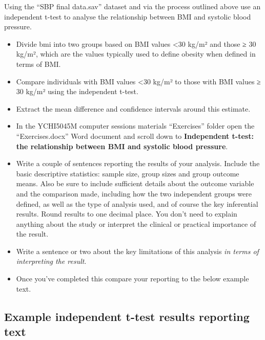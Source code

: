 \documentclass[
]{book}
\begin{document}
Using the ``SBP final data.sav'' dataset and via the process outlined above use an independent t-test to analyse the relationship between BMI and systolic blood pressure.

\begin{itemize}
\item
  Divide bmi into two groups based on BMI values \textless30 kg/m² and those ≥ 30 kg/m², which are the values typically used to define obesity when defined in terms of BMI.
\item
  Compare individuals with BMI values \textless30 kg/m² to those with BMI values ≥ 30 kg/m² using the independent t-test.
\item
  Extract the mean difference and confidence intervals around this estimate.
\item
  In the YCHI5045M computer sessions materials ``Exercises'' folder open the ``Exercises.docx'' Word document and scroll down to \textbf{Independent t-test: the relationship between BMI and systolic blood pressure}.
\item
  Write a couple of sentences reporting the results of your analysis. Include the basic descriptive statistics: sample size, group sizes and group outcome means. Also be sure to include sufficient details about the outcome variable and the comparison made, including how the two independent groups were defined, as well as the type of analysis used, and of course the key inferential results. Round results to one decimal place. You don't need to explain anything about the study or interpret the clinical or practical importance of the result.
\item
  Write a sentence or two about the key limitations of this analysis \emph{in terms of interpreting the result}.
\item
  Once you've completed this compare your reporting to the below example text.
\end{itemize}

\hypertarget{example-independent-t-test-results-reporting-text}{%
\subsection{Example independent t-test results reporting text}\label{example-independent-t-test-results-reporting-text}}
\end{document}
